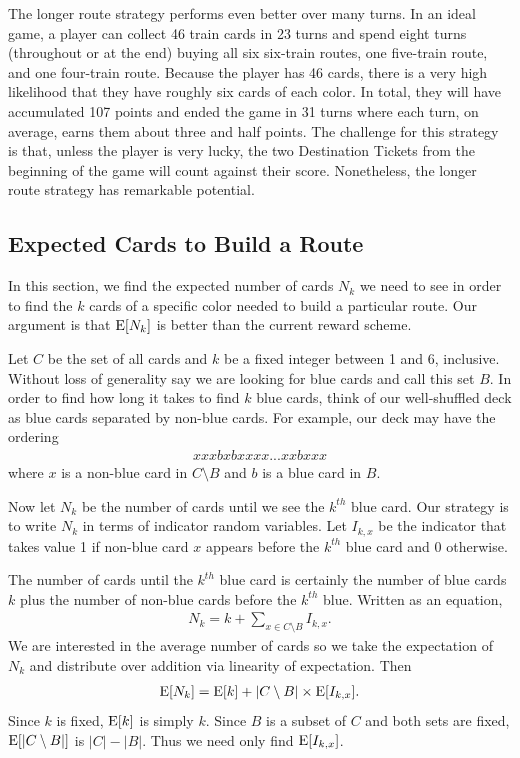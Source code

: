 The longer route strategy performs even better over many turns.
In an ideal game, a player can collect 46 train cards in 23 turns
and spend eight turns (throughout or at the end) buying all six
six-train routes, one five-train route, and one four-train route.
Because the player has 46 cards, there is a very high likelihood that
they have roughly six cards of each color.
In total, they will have accumulated 107 points and ended the game in 31 turns
where each turn, on average, earns them about three and half points.
The challenge for this strategy is that, unless the player is very lucky,
the two Destination Tickets from the beginning of the game will count
against their score.
Nonetheless, the longer route strategy has remarkable potential.

\subsection{Expected Cards to Build a Route}\label{sec:collecting_cards}
In this section, we find the expected number of cards
$N_k$ we need to see in order to find the $k$ cards of a specific color
needed to build a particular route.
Our argument is that $\operatorname{\mathrm{E}}[N_k]$ is better than the
current reward scheme.

Let $C$ be the set of all cards and $k$ be a fixed integer
between 1 and 6, inclusive.
Without loss of generality say we are looking
for blue cards and call this set $B$.
In order to find how long it takes to find $k$ blue cards,
think of our well-shuffled deck as
blue cards separated by non-blue cards.
For example, our deck may have the ordering
\begin{align}
    xxxbxbxxxx...xxbxxx \nonumber
\end{align}
where $x$ is a non-blue card in $C \setminus B$
and $b$ is a blue card in $B$.

Now let $N_k$ be the number of cards until
we see the $k^{th}$ blue card.
Our strategy is to write $N_k$ in terms of
indicator random variables.
Let $I_{k,x}$ be the indicator that takes value 1
if non-blue card $x$ appears before the $k^{th}$ blue card
and 0 otherwise.

The number of cards until the $k^{th}$ blue card
is certainly the number of blue cards $k$
plus the number of non-blue cards before the $k^{th}$ blue.
Written as an equation,
\begin{align}
    N_k = k + \sum_{x \in C \setminus B} I_{k,x}. \nonumber
\end{align}
We are interested in the average number of cards
so we take the expectation of $N_k$ and distribute
over addition via linearity of expectation.
Then
\begin{align} \label{eq:expected_card}
    \operatorname{\mathrm{E}}[N_k] = \operatorname{\mathrm{E}}[k] + |C \setminus B| \times \operatorname{\mathrm{E}}[I_{k,x}].
\end{align}
Since $k$ is fixed, $\operatorname{\mathrm{E}}[k]$ is simply $k$.
Since $B$ is a subset of $C$ and both sets are fixed,
$\operatorname{\mathrm{E}}[|C \setminus B|]$ is $|C| - |B|$.
Thus we need only find $\operatorname{\mathrm{E}}[I_{k,x}]$.

